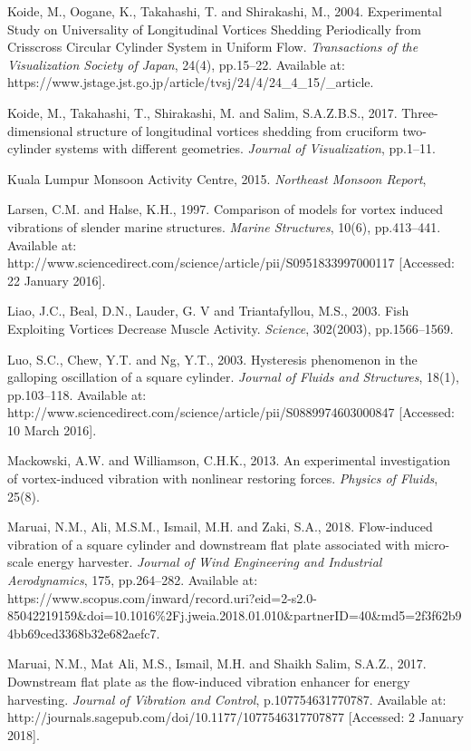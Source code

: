 \documentclass[]{article}
\begin{document}
Koide, M., Oogane, K., Takahashi, T. and Shirakashi, M., 2004.
Experimental Study on Universality of Longitudinal Vortices Shedding
Periodically from Crisscross Circular Cylinder System in Uniform Flow.
\emph{Transactions of the Visualization Society of Japan}, 24(4),
pp.15--22. Available at:
https://www.jstage.jst.go.jp/article/tvsj/24/4/24\_4\_15/\_article.

Koide, M., Takahashi, T., Shirakashi, M. and Salim, S.A.Z.B.S., 2017.
Three-dimensional structure of longitudinal vortices shedding from
cruciform two-cylinder systems with different geometries. \emph{Journal
of Visualization}, pp.1--11.

Kuala Lumpur Monsoon Activity Centre, 2015. \emph{Northeast Monsoon
Report},

Larsen, C.M. and Halse, K.H., 1997. Comparison of models for vortex
induced vibrations of slender marine structures. \emph{Marine
Structures}, 10(6), pp.413--441. Available at:
http://www.sciencedirect.com/science/article/pii/S0951833997000117
{[}Accessed: 22 January 2016{]}.

Liao, J.C., Beal, D.N., Lauder, G. V and Triantafyllou, M.S., 2003. Fish
Exploiting Vortices Decrease Muscle Activity. \emph{Science}, 302(2003),
pp.1566--1569.

Luo, S.C., Chew, Y.T. and Ng, Y.T., 2003. Hysteresis phenomenon in the
galloping oscillation of a square cylinder. \emph{Journal of Fluids and
Structures}, 18(1), pp.103--118. Available at:
http://www.sciencedirect.com/science/article/pii/S0889974603000847
{[}Accessed: 10 March 2016{]}.

Mackowski, A.W. and Williamson, C.H.K., 2013. An experimental
investigation of vortex-induced vibration with nonlinear restoring
forces. \emph{Physics of Fluids}, 25(8).

Maruai, N.M., Ali, M.S.M., Ismail, M.H. and Zaki, S.A., 2018.
Flow-induced vibration of a square cylinder and downstream flat plate
associated with micro-scale energy harvester. \emph{Journal of Wind
Engineering and Industrial Aerodynamics}, 175, pp.264--282. Available
at:
https://www.scopus.com/inward/record.uri?eid=2-s2.0-85042219159\&doi=10.1016\%2Fj.jweia.2018.01.010\&partnerID=40\&md5=2f3f62b94bb69ced3368b32e682aefc7.

Maruai, N.M., Mat Ali, M.S., Ismail, M.H. and Shaikh Salim, S.A.Z.,
2017. Downstream flat plate as the flow-induced vibration enhancer for
energy harvesting. \emph{Journal of Vibration and Control},
p.107754631770787. Available at:
http://journals.sagepub.com/doi/10.1177/1077546317707877 {[}Accessed: 2
January 2018{]}.
\end{document}
